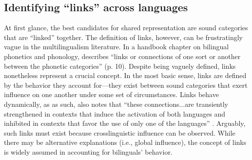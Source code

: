 \subsection{Identifying ``links'' across languages}\label{ch4:sec:links}

At first glance, the best candidates for shared representation are sound categories that are ``linked'' together. The definition of links, however, can be frustratingly vague in the multilingualism literature. In a handbook chapter on bilingual phonetics and phonology, \citet{simonet_2016_bilingualism} describes ``links or connections of one sort or another between the phonetic categories'' (p. 10). Despite being vaguely defined, links nonetheless represent a crucial concept. In the most basic sense, links are defined by the behavior they account for---they exist between sound categories that exert influence on one another under some set of circumstances. Links behave dynamically, as as such,  \citeauthor{simonet_2016_bilingualism} also notes that ``these connections...are transiently strengthened in contexts that induce the activation of both languages and inhibited in contexts that favor the use of only one of the languages'' \citeyearpar[][p. 10]{simonet_2016_bilingualism}. Arguably, such links must exist because crosslinguistic influence can be observed. While there may be alternative explanations (i.e., global influence), the concept of links is widely assumed in accounting for bilinguals' behavior. 

